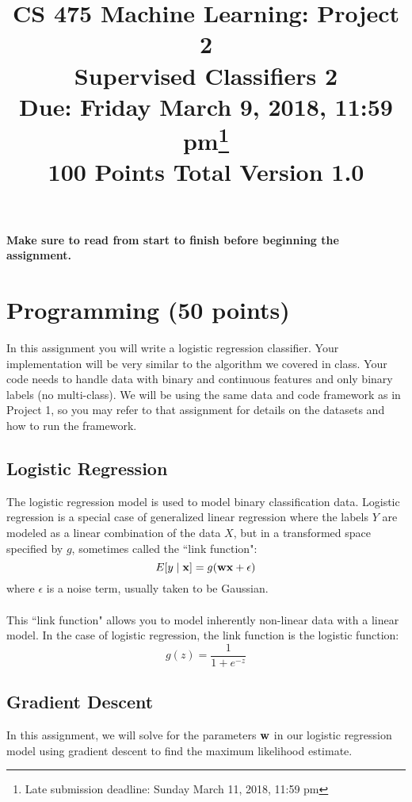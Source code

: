 \documentclass[11pt]{article}
\title{CS 475 Machine Learning: Project 2\\Supervised Classifiers 2\\
\Large{Due: Friday March 9, 2018, 11:59 pm}\footnote{Late submission deadline: Sunday March 11, 2018, 11:59 pm}\\
100 Points Total \hspace{1cm} Version 1.0}
\author{}
\date{}
\newcommand{\vw}{{\bf w}}
\newcommand{\vx}{{\bf x}}
\begin{document}
\large
\maketitle
\thispagestyle{headings}

\vspace{-.5in}

{\bf Make sure to read from start to finish before beginning the assignment.}
\section{Programming (50 points)}
In this assignment you will write a logistic regression classifier. Your implementation will be very similar to 
the algorithm we covered in class. Your code needs to handle data with binary and continuous features and only binary labels (no multi-class).
We will be using the same data and code framework as in Project 1, so you may refer to that assignment for details on the datasets and how to run the framework.

\subsection{Logistic Regression}
The logistic regression model is used to model binary classification data. Logistic regression is a special case of generalized linear regression where the labels $Y$ are modeled as a linear combination of the data $X$, but in a transformed space specified by $g$, sometimes called the ``link function":
\begin{equation}
E[y \mid \vx] = g(\vw \vx + \epsilon)
\end{equation}
where $\epsilon$ is a noise term, usually taken to be Gaussian.\\
\\
This ``link function" allows you to model inherently non-linear data with a linear model. In the case of logistic regression, the link function is the logistic function:
\begin{equation}
g(z) = \frac{1}{1 + e^{-z}}
\end{equation}

\subsection{Gradient Descent}
In this assignment, we will solve for the parameters $\vw$ in our logistic regression model using gradient descent to find the maximum likelihood estimate.
\end{document}
